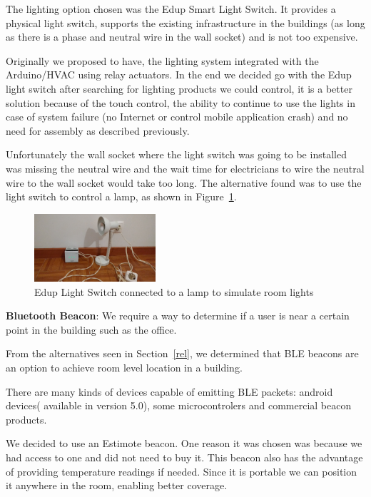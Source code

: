 \documentclass[conference]{IEEEtran}
\begin{document}
The lighting option chosen was the Edup Smart Light Switch. It provides a physical light switch, supports the existing infrastructure in the buildings (as long as there is a phase and neutral wire in the wall socket) and is not too expensive.


Originally we proposed to have, the lighting system integrated with the Arduino/\ac{HVAC} using relay actuators. In the end we decided go with the Edup light switch after searching for lighting products we could control, it is a better solution because of the touch control, the ability to continue to use the lights in case of system failure (no Internet or control mobile application crash) and no need for assembly as described previously.

Unfortunately the wall socket where the light switch was going to be installed was missing the neutral wire and the wait time for electricians to wire the neutral wire to the wall socket would take too long. The alternative found was to use the light switch to control a lamp, as shown in Figure~\ref{imp_light_switch_light}.


\begin{figure}[htbp]
\centering
\includegraphics[width=0.4\textwidth]{Figures/imp_light_switch_light}
\caption{Edup Light Switch connected to a lamp to simulate room lights}
\label{imp_light_switch_light}
\end{figure}


\textbf{Bluetooth Beacon}: We require a way to determine if a user is near a certain point in the building such as the office.

From the alternatives seen in Section~\ref{rel}, we  determined that \ac{BLE} beacons are an option to achieve room level location in a building.

There are many kinds of devices capable of emitting \ac{BLE} packets: android devices( available in version 5.0), some microcontrolers and commercial beacon products.

We decided to use an Estimote beacon. One reason it was chosen was because we had access to one and did not need to buy it. This beacon also has the advantage of providing temperature readings if needed. Since it is portable we can position it anywhere in the room, enabling better coverage.
\end{document}
